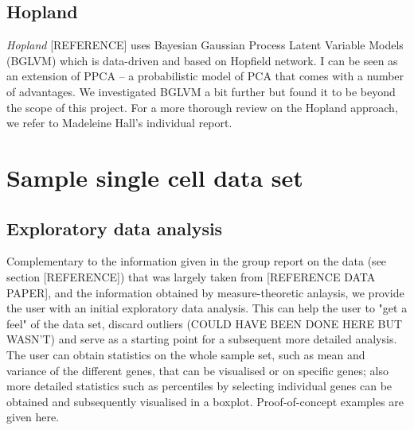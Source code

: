 \documentclass[journal, a4paper]{IEEEtran}
\begin{document}
\subsection{Hopland}
\textit{Hopland} [REFERENCE] uses Bayesian Gaussian Process Latent Variable Models (BGLVM) which is data-driven and based on Hopfield network. I can be seen as an extension of PPCA -- a probabilistic model of PCA that comes with a number of advantages.
We investigated BGLVM a bit further but found it to be beyond the scope of this project.
For a more thorough review on the Hopland approach, we refer to Madeleine Hall's individual report.




\section{Sample single cell data set}


\subsection{Exploratory data analysis}

Complementary to the information given in the group report on the data (see section [REFERENCE]) that was largely taken from [REFERENCE DATA PAPER], and the information obtained by measure-theoretic anlaysis, we provide the user with an initial exploratory data analysis. This can help the user to "get a feel" of the data set, discard outliers (COULD HAVE BEEN DONE HERE BUT WASN'T) and serve as a starting point for a subsequent more detailed analysis. \\
The user can obtain statistics on the whole sample set, such as mean and variance of the different genes, that can be visualised or on specific genes; also more detailed statistics such as percentiles by selecting individual genes can be obtained and subsequently visualised in a boxplot.
Proof-of-concept examples are given here.\\
\end{document}
